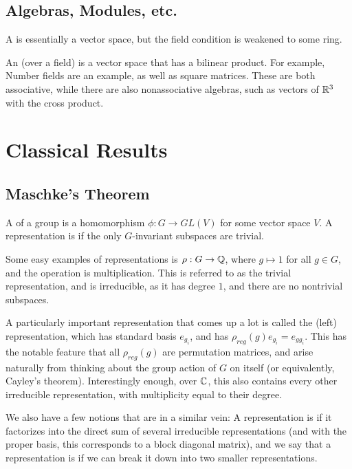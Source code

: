 \documentclass{article}
\begin{document}
\subsection{Algebras, Modules, etc.}
A  is essentially a vector space, but the field condition is weakened to some ring.

An  (over a field) is a vector space that has a bilinear product. For example, Number fields are an example, as well as square matrices. These are both associative, while there are also nonassociative algebras, such as vectors of $\mathbb R^3$ with the cross product.

\section{Classical Results}
\subsection{Maschke's Theorem}
\begin{definition}
A  of a group is a homomorphism $\phi : G \to GL(V)$ for some vector space $V$. A representation is  if the only $G$-invariant subspaces are trivial.
\end{definition}

Some easy examples of representations is $\rho : G \to \mathbb Q$, where $g \mapsto 1$ for all $g \in G$, and the operation is multiplication. This is referred to as the trivial representation, and is irreducible, as it has degree $1$, and there are no nontrivial subspaces.

A particularly important representation that comes up a lot is called the (left)  representation, which has standard basis $e_{g_i}$, and has $\rho_{reg}(g) e_{g_i} = e_{gg_i}$. This has the notable feature that all  $\rho_{reg} (g)$ are permutation matrices, and arise naturally from thinking about the group action of $G$ on itself (or equivalently, Cayley's theorem). Interestingly enough, over $\mathbb C$, this also contains every other irreducible representation, with multiplicity equal to their degree.

We also have a few notions that are in a similar vein: A representation is  if it factorizes into the direct sum of several irreducible representations (and with the proper basis, this corresponds to a block diagonal matrix), and we say that a representation is  if we can break it down into two smaller representations.
\end{document}
